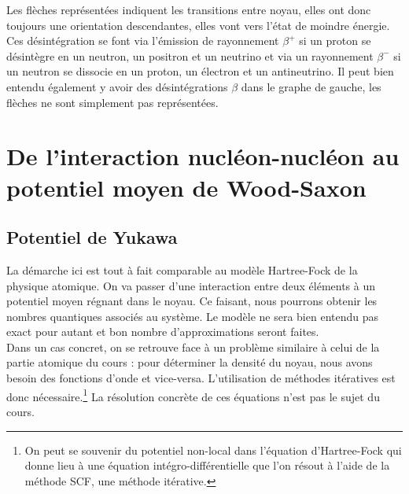 Les flèches représentées indiquent les transitions entre noyau, elles ont donc toujours une orientation descendantes, elles vont vers l'état de moindre énergie. Ces désintégration se font via l'émission de rayonnement $\beta^+$ si un proton se désintègre en un neutron, un positron et un neutrino et via un rayonnement $\beta^-$ si un neutron se dissocie en un proton, un électron et un antineutrino. Il peut bien entendu également y avoir des désintégrations $\beta$ dans le graphe de gauche, les flèches ne sont simplement pas représentées.













\section{De l'interaction nucléon-nucléon au potentiel moyen de Wood-Saxon}
\subsection{Potentiel de Yukawa}


La démarche ici est tout à fait comparable au modèle Hartree-Fock de la physique atomique. On va passer d'une interaction entre deux éléments à un potentiel moyen régnant dans le noyau. Ce faisant, nous pourrons obtenir les nombres quantiques associés au système. Le modèle ne sera bien entendu pas exact pour autant et bon nombre d'approximations seront faites.\\

Dans un cas concret, on se retrouve face à un problème similaire à celui de la partie atomique du cours : pour déterminer la densité du noyau, nous avons besoin des fonctions d'onde et vice-versa. L'utilisation de méthodes itératives est donc nécessaire.\footnote{On peut se souvenir du potentiel non-local dans l'équation d'Hartree-Fock qui donne lieu à une équation intégro-différentielle que l'on résout à l'aide de la méthode SCF, une méthode itérative.} La résolution concrète de ces équations n'est pas le sujet du cours.\\

